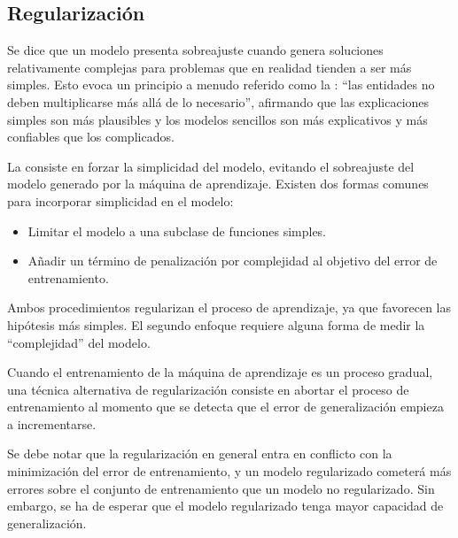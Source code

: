 %
%
\subsection{Regularización}
%
Se dice que un modelo presenta sobreajuste cuando genera soluciones
relativamente complejas para problemas que en realidad tienden a ser
más simples.  Esto evoca un principio a menudo referido como la
: ``las entidades no deben multiplicarse más allá
de lo necesario'', afirmando que las explicaciones simples son más
plausibles y los modelos sencillos son más explicativos y más
confiables que los complicados.

La  consiste en forzar la simplicidad del modelo,
evitando el
sobreajuste del modelo generado por la máquina de aprendizaje. Existen
dos formas comunes para incorporar simplicidad en el modelo:
%
\begin{itemize}
\item Limitar el modelo a una subclase de funciones simples.
\item Añadir un término de penalización por complejidad al objetivo
  del error de entrenamiento.
\end{itemize}
%
Ambos procedimientos regularizan el proceso de aprendizaje, ya
que favorecen las hipótesis más simples.
El segundo enfoque requiere alguna forma de medir la ``complejidad'' del
modelo.

Cuando el entrenamiento de la máquina de aprendizaje es un proceso
gradual, una técnica alternativa de regularización consiste en
abortar el proceso de entrenamiento al momento que se detecta
que el error de generalización empieza a incrementarse.

Se debe notar que la regularización en general entra en conflicto con
la minimización del error de entrenamiento, y un modelo regularizado
cometerá más errores sobre el conjunto de entrenamiento que un modelo
no regularizado.  Sin embargo, se ha de esperar que el modelo
regularizado tenga mayor capacidad de generalización.
